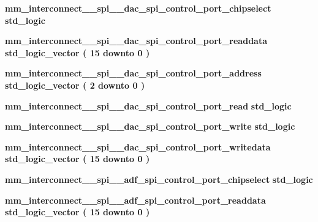 \begin{DoxyCompactItemize}
\item 
{\bf mm\+\_\+interconnect\+\_\+\_\+spi\+\_\+\_\+dac\+\_\+spi\+\_\+control\+\_\+port\+\_\+chipselect} {\bfseries \textcolor{comment}{std\+\_\+logic}\textcolor{vhdlchar}{ }} 
\item 
{\bf mm\+\_\+interconnect\+\_\+\_\+spi\+\_\+\_\+dac\+\_\+spi\+\_\+control\+\_\+port\+\_\+readdata} {\bfseries \textcolor{comment}{std\+\_\+logic\+\_\+vector}\textcolor{vhdlchar}{ }\textcolor{vhdlchar}{(}\textcolor{vhdlchar}{ }\textcolor{vhdlchar}{ } \textcolor{vhdldigit}{15} \textcolor{vhdlchar}{ }\textcolor{keywordflow}{downto}\textcolor{vhdlchar}{ }\textcolor{vhdlchar}{ } \textcolor{vhdldigit}{0} \textcolor{vhdlchar}{ }\textcolor{vhdlchar}{)}\textcolor{vhdlchar}{ }} 
\item 
{\bf mm\+\_\+interconnect\+\_\+\_\+spi\+\_\+\_\+dac\+\_\+spi\+\_\+control\+\_\+port\+\_\+address} {\bfseries \textcolor{comment}{std\+\_\+logic\+\_\+vector}\textcolor{vhdlchar}{ }\textcolor{vhdlchar}{(}\textcolor{vhdlchar}{ }\textcolor{vhdlchar}{ } \textcolor{vhdldigit}{2} \textcolor{vhdlchar}{ }\textcolor{keywordflow}{downto}\textcolor{vhdlchar}{ }\textcolor{vhdlchar}{ } \textcolor{vhdldigit}{0} \textcolor{vhdlchar}{ }\textcolor{vhdlchar}{)}\textcolor{vhdlchar}{ }} 
\item 
{\bf mm\+\_\+interconnect\+\_\+\_\+spi\+\_\+\_\+dac\+\_\+spi\+\_\+control\+\_\+port\+\_\+read} {\bfseries \textcolor{comment}{std\+\_\+logic}\textcolor{vhdlchar}{ }} 
\item 
{\bf mm\+\_\+interconnect\+\_\+\_\+spi\+\_\+\_\+dac\+\_\+spi\+\_\+control\+\_\+port\+\_\+write} {\bfseries \textcolor{comment}{std\+\_\+logic}\textcolor{vhdlchar}{ }} 
\item 
{\bf mm\+\_\+interconnect\+\_\+\_\+spi\+\_\+\_\+dac\+\_\+spi\+\_\+control\+\_\+port\+\_\+writedata} {\bfseries \textcolor{comment}{std\+\_\+logic\+\_\+vector}\textcolor{vhdlchar}{ }\textcolor{vhdlchar}{(}\textcolor{vhdlchar}{ }\textcolor{vhdlchar}{ } \textcolor{vhdldigit}{15} \textcolor{vhdlchar}{ }\textcolor{keywordflow}{downto}\textcolor{vhdlchar}{ }\textcolor{vhdlchar}{ } \textcolor{vhdldigit}{0} \textcolor{vhdlchar}{ }\textcolor{vhdlchar}{)}\textcolor{vhdlchar}{ }} 
\item 
{\bf mm\+\_\+interconnect\+\_\+\_\+spi\+\_\+\_\+adf\+\_\+spi\+\_\+control\+\_\+port\+\_\+chipselect} {\bfseries \textcolor{comment}{std\+\_\+logic}\textcolor{vhdlchar}{ }} 
\item 
{\bf mm\+\_\+interconnect\+\_\+\_\+spi\+\_\+\_\+adf\+\_\+spi\+\_\+control\+\_\+port\+\_\+readdata} {\bfseries \textcolor{comment}{std\+\_\+logic\+\_\+vector}\textcolor{vhdlchar}{ }\textcolor{vhdlchar}{(}\textcolor{vhdlchar}{ }\textcolor{vhdlchar}{ } \textcolor{vhdldigit}{15} \textcolor{vhdlchar}{ }\textcolor{keywordflow}{downto}\textcolor{vhdlchar}{ }\textcolor{vhdlchar}{ } \textcolor{vhdldigit}{0} \textcolor{vhdlchar}{ }\textcolor{vhdlchar}{)}\textcolor{vhdlchar}{ }} 

\end{DoxyCompactItemize}
